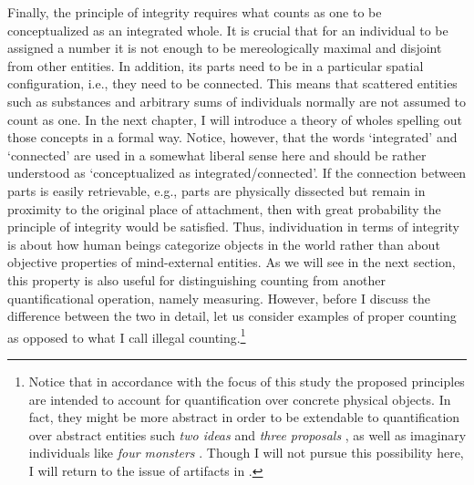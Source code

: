 Finally, the principle of integrity requires what counts as one to be conceptualized as an integrated whole. It is crucial that for an individual to be assigned a number it is not enough to be mereologically maximal and disjoint from other entities. In addition, its parts need to be in a particular spatial configuration, i.e., they need to be connected. This means that scattered entities such as substances and arbitrary sums of individuals normally are not assumed to count as one. In the next chapter, I will introduce a theory of wholes spelling out those concepts in a formal way. Notice, however, that the words `integrated' and `connected' are used in a somewhat liberal sense here and should be rather understood as `conceptualized as integrated/connected'. If the connection between parts is easily retrievable, e.g., parts are physically dissected but remain in proximity to the original place of attachment, then with great probability the principle of integrity would be satisfied. Thus, individuation in terms of integrity is about how human beings categorize objects in the world rather than about objective properties of mind-external entities. As we will see in the next section, this property is also useful for distinguishing counting from another quantificational operation, namely measuring. However, before I discuss the difference between the two in detail, let us consider examples of proper counting as opposed to what I call illegal counting.\footnote{Notice that in accordance with the focus of this study the proposed principles are intended to account for quantification over concrete physical objects. In fact, they might be more abstract in order to be extendable to quantification over abstract entities such \textit{two ideas} and \textit{three proposals} \citep[e.g.,][]{grimm2014individuating,sutton_filip2020informational}, as well as imaginary individuals like \textit{four monsters} \citep[e.g.,][]{haslinger_schmitt-toappear-distinguishing}. Though I will not pursue this possibility here, I will return to the issue of artifacts in .}

